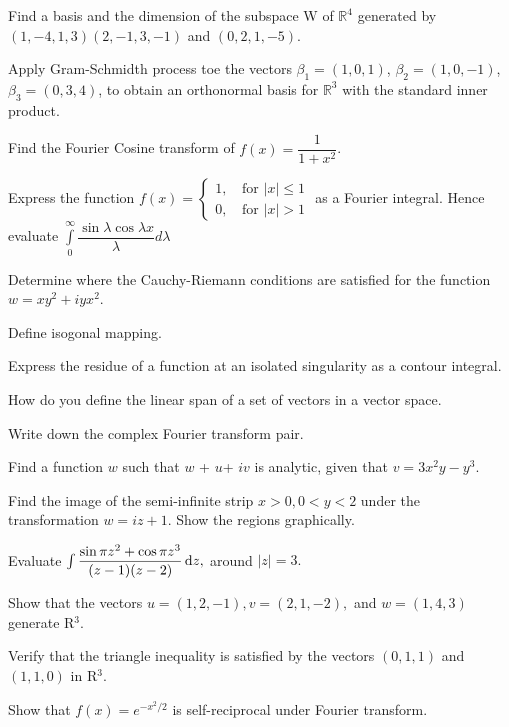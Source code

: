 \item \iitem Find a basis and the dimension of the subspace W of $\mathbb{R}^4$
  generated by $(1, -4, 1, 3) (2, -1, 3, -1)$ and $(0, 2, 1, -5)$.
\Or
\item Apply Gram-Schmidth process toe the vectors $\beta_1 = (1, 0, 1)$,
  $\beta_2 = (1, 0, -1)$, $\beta_3 = (0, 3, 4)$, to obtain an
  orthonormal basis for $\mathbb{R}^3$ with the standard inner product.
\ene

\item \iitem Find the Fourier Cosine transform of $f(x) = \dfrac{1}{1 + x^2}$.
\Or
\item Express the function
$f(x) =
\begin{cases}
1, & \, \text{for } |x| \leq 1\\
0, & \, \text{for } |x| > 1
\end{cases}$
as a Fourier integral. Hence evaluate $\int\limits_0^\infty
\dfrac{\sin\lambda \cos\lambda x}{\lambda} d\lambda$
\ene

\markC
\ene

\newpage

\sub{\subj}
\maxtime

\partA

\iitem Determine where the Cauchy-Riemann conditions are satisfied for the function
 $ w = xy^2 + iyx^2$.
\item Define isogonal mapping.
\item Express the residue of a function at an isolated singularity as a contour integral.
\item How do you define the linear span of a set of vectors in a vector space.
\item Write down the complex Fourier transform pair.

\markA
\partB

\item Find a function $w$ such that $w$ + $u$+ $iv$ is analytic, given that $v = 3x^2y - y^3$.
\item Find the image of the semi-infinite strip $x > 0, 0 < y < 2$ under the transformation
  $w = iz +1$. Show the regions graphically.
\item Evaluate $\int\dfrac{\sin \pi z^2 + \cos \pi z^3}{(z - 1)(z - 2)}\,\mathrm{d} z,$ around $|z| = 3.$
\item Show that the vectors $u = (1, 2, -1), v = (2, 1, -2),$ and $w = (1, 4, 3)$ generate R$^3$.
\item Verify that the triangle inequality is satisfied by the vectors $(0, 1, 1)$ and $(1, 1, 0)$ in R$^3$.
\item Show that $f(x) = e^{-x^2/2}$ is self-reciprocal under Fourier transform.


